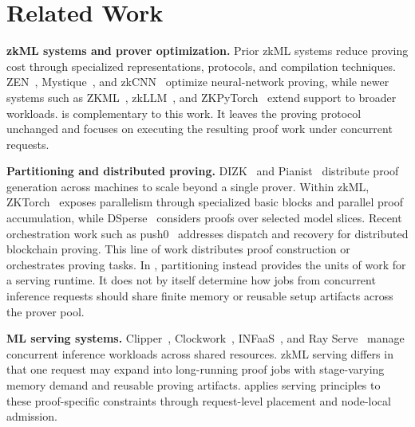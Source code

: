\section{Related Work}
\label{sec:related-work}

\noindent\textbf{zkML systems and prover optimization.}
Prior zkML systems reduce proving cost through specialized representations,
protocols, and compilation techniques. ZEN~\cite{boyuan2021zen},
Mystique~\cite{weng2021mystique}, and zkCNN~\cite{liu2021zkcnn} optimize
neural-network proving, while newer systems such as
ZKML~\cite{chen2024zkml}, zkLLM~\cite{sin2024zkllm}, and
ZKPyTorch~\cite{xie2025zkpytorch} extend support to broader workloads.
\TITLE{} is complementary to this work. It leaves the proving protocol unchanged and
focuses on executing the resulting proof work under concurrent requests.

\noindent\textbf{Partitioning and distributed proving.}
DIZK~\cite{wu2018dizk} and Pianist~\cite{liu2024pianist} distribute proof
generation across machines to scale beyond a single prover. Within zkML,
ZKTorch~\cite{chen2025zktorch} exposes parallelism through specialized
basic blocks and parallel proof accumulation, while
DSperse~\cite{ivanov2025dsperse} considers proofs over selected model
slices. Recent orchestration work such as push0~\cite{ahmadvand2026push0}
addresses dispatch and recovery for distributed blockchain proving. This line
of work distributes proof construction or orchestrates proving tasks. In
\TITLE{}, partitioning instead provides the units of work for a serving
runtime. It does not by itself determine how jobs from concurrent inference
requests should share finite memory or reusable setup artifacts across the
prover pool.

\noindent\textbf{ML serving systems.}
Clipper~\cite{crankshaw2017clipper}, Clockwork~\cite{gujarati2020serving},
INFaaS~\cite{romero2021infaas}, and Ray Serve~\cite{rayserve} manage
concurrent inference workloads across shared resources. zkML serving differs
in that one request may expand into long-running proof jobs with
stage-varying memory demand and reusable proving artifacts. \TITLE{} applies
serving principles to these proof-specific constraints through request-level
placement and node-local admission.
